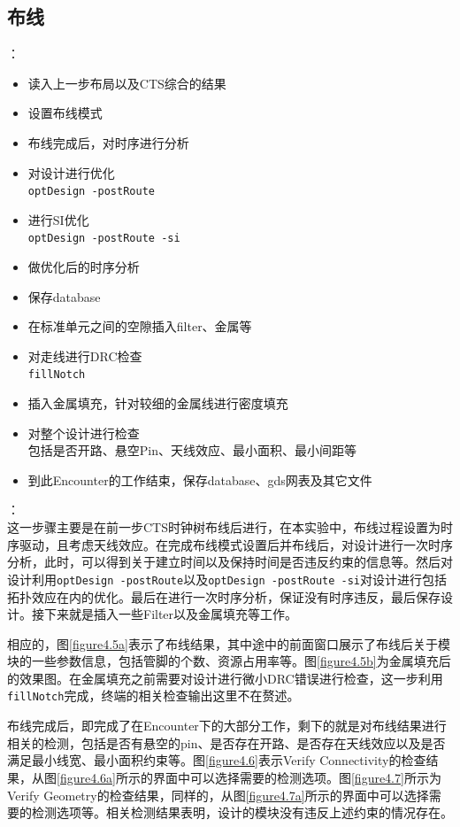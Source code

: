\documentclass[a4paper,12pt]{report}
\begin{document}
\subsection{布线}
：
\begin{itemize}
\item 读入上一步布局以及CTS综合的结果
\item 设置布线模式
\item 布线完成后，对时序进行分析
\item 对设计进行优化\\
	\verb|optDesign -postRoute|
\item 进行SI优化\\
	\verb|optDesign -postRoute -si|
\item 做优化后的时序分析
\item 保存database
\item 在标准单元之间的空隙插入filter、金属等
\item 对走线进行DRC检查\\
	\verb|fillNotch|
\item 插入金属填充，针对较细的金属线进行密度填充
\item 对整个设计进行检查\\
	包括是否开路、悬空Pin、天线效应、最小面积、最小间距等
\item 到此Encounter的工作结束，保存database、gds网表及其它文件
\end{itemize}
：\\
\indent 这一步骤主要是在前一步CTS时钟树布线后进行，在本实验中，布线过程设置为时序驱动，且考虑天线效应。在完成布线模式设置后并布线后，对设计进行一次时序分析，此时，可以得到关于建立时间以及保持时间是否违反约束的信息等。然后对设计利用\verb|optDesign -postRoute|以及\verb|optDesign -postRoute -si|对设计进行包括拓扑效应在内的优化。最后在进行一次时序分析，保证没有时序违反，最后保存设计。接下来就是插入一些Filter以及金属填充等工作。

相应的，图\ref{figure4.5a}表示了布线结果，其中途中的前面窗口展示了布线后关于模块的一些参数信息，包括管脚的个数、资源占用率等。图\ref{figure4.5b}为金属填充后的效果图。在金属填充之前需要对设计进行微小DRC错误进行检查，这一步利用\verb|fillNotch|完成，终端的相关检查输出这里不在赘述。

布线完成后，即完成了在Encounter下的大部分工作，剩下的就是对布线结果进行相关的检测，包括是否有悬空的pin、是否存在开路、是否存在天线效应以及是否满足最小线宽、最小面积约束等。图\ref{figure4.6}表示Verify Connectivity的检查结果，从图\ref{figure4.6a}所示的界面中可以选择需要的检测选项。图\ref{figure4.7}所示为Verify Geometry的检查结果，同样的，从图\ref{figure4.7a}所示的界面中可以选择需要的检测选项等。相关检测结果表明，设计的模块没有违反上述约束的情况存在。
\end{document}
